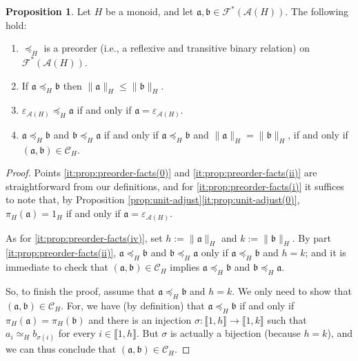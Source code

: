 \documentclass{report}
\newcommand{\A}{\mathcal{A}}
\newcommand{\C}{\mathcal{C}}
\newcommand{\llb}{\llbracket}
\newcommand{\rrb}{\rrbracket}
\renewcommand{\:}{\text{:}}
\theoremstyle{definition}
\newtheorem{prop}[defn]{Proposition}
\begin{document}
%
\begin{prop}\label{preorder-facts}
	Let $H$ be a monoid, and let $\mathfrak{a},\mathfrak{b}\in \mathscr F^*(\A(H))$. The following hold:
	\begin{enumerate}[label = {\textup{(\roman{*})}}]
		\item\label{it:prop:preorder-facts(0)} $\preceq_H$ is a preorder \textup{(}i.e., a reflexive and transitive binary relation\textup{)} on $\mathscr F^\ast(\mathscr A(H))$.
		\item\label{it:prop:preorder-facts(ii)} If $\mathfrak{a} \preceq_H \mathfrak{b}$ then $\| \mathfrak{a} \|_H \le \| \mathfrak{b} \|_H$.
		\item\label{it:prop:preorder-facts(i)} $\varepsilon_{\mathscr A(H)} \preceq_H \mathfrak a$ if and only if $\mathfrak a = \varepsilon_{\mathscr A(H)}$.
		\item\label{it:prop:preorder-facts(iv)} $\mathfrak{a} \preceq_H \mathfrak{b}$ and $\mathfrak{b} \preceq_H \mathfrak{a}$ if and only if $\mathfrak a \preceq_H \mathfrak b$ and $\|\mathfrak a\|_H = \|\mathfrak b\|_H$, if and only if $(\mathfrak{a},\mathfrak{b}) \in \C_H$.
	\end{enumerate}
\end{prop}
%
\begin{proof}
	Points \ref{it:prop:preorder-facts(0)} and \ref{it:prop:preorder-facts(ii)} are straightforward from our definitions, and for  \ref{it:prop:preorder-facts(i)} it suffices to note that, by Proposition \ref{prop:unit-adjust}\ref{it:prop:unit-adjust(0)}, $\pi_H(\mathfrak a) = 1_H$ if and only if $\mathfrak a = \varepsilon_{\mathscr A(H)}$. 
	
	As for \ref{it:prop:preorder-facts(iv)}, set $h := \|\mathfrak a\|_H$ and $k := \|\mathfrak b\|_H$. 
	By part \ref{it:prop:preorder-facts(ii)}, $\mathfrak{a} \preceq_H \mathfrak{b}$ and $\mathfrak{b} \preceq_H \mathfrak{a}$ only if  $\mathfrak a \preceq_H \mathfrak b$ and $h = k$; and it is immediate to check that $(\mathfrak{a},\mathfrak{b}) \in \C_H$ implies $\mathfrak{a} \preceq_H \mathfrak{b}$ and $\mathfrak{b} \preceq_H \mathfrak{a}$. 
	
	So, to finish the proof, assume that $\mathfrak a \preceq_H \mathfrak b$ and $h = k$. We only need to show that $(\mathfrak a, \mathfrak b) \in \mathscr C_H$. For, we have (by definition) that $\mathfrak a \preceq_H \mathfrak b$ if and only if $\pi_H(\mathfrak a) = \pi_H(\mathfrak b)$ and there is an injection $\sigma: \llb 1, h \rrb \to \llb 1, k \rrb$ 
	such that $a_i \simeq_H b_{\sigma(i)}$ for every $i \in \llb 1, h \rrb$. But $\sigma$ is actually a bijection (because $h = k$), and we can thus conclude that $(\mathfrak a, \mathfrak b) \in \mathscr C_H$.
\end{proof}
\end{document}
